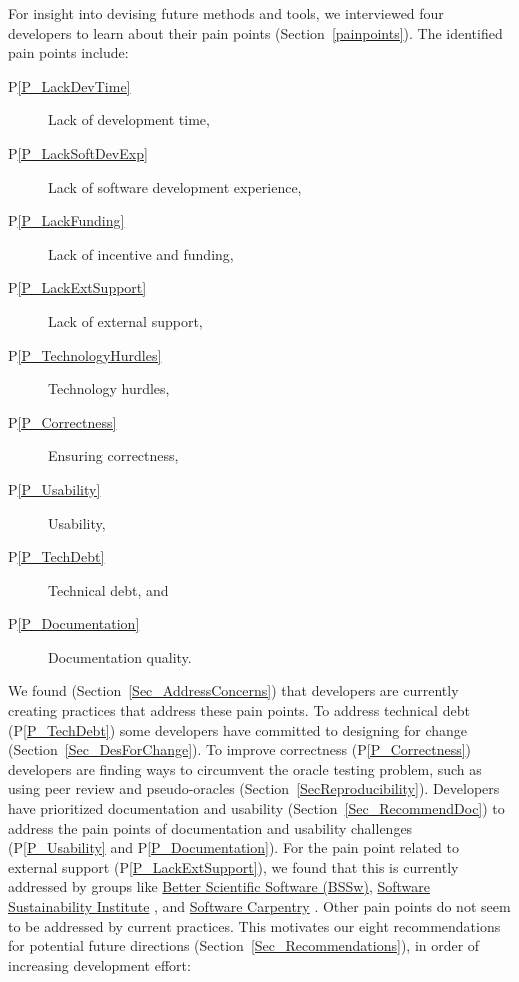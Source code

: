 \documentclass[final, 3p, times, authoryear]{elsarticle}
\newcommand{\ppref}[1]{P\ref{#1}}
\begin{document}
For insight into devising future methods and tools, we interviewed four
developers to learn about their pain points (Section~\ref{painpoints}).  The
identified pain points include: 

\begin{description}
\item [\ppref{P_LackDevTime}] Lack of development time, %
\item [\ppref{P_LackSoftDevExp}] Lack of software development experience, %
\item [\ppref{P_LackFunding}] Lack of incentive and funding, %
\item [\ppref{P_LackExtSupport}] Lack of external support, %
\item [\ppref{P_TechnologyHurdles}] Technology hurdles, %
\item [\ppref{P_Correctness}] Ensuring correctness, %
\item [\ppref{P_Usability}] Usability, %
\item [\ppref{P_TechDebt}] Technical debt, and %
\item [\ppref{P_Documentation}] Documentation quality. %
\end{description}  

We found (Section~\ref{Sec_AddressConcerns}) that developers are currently
creating practices that address these pain points.  To address technical debt
(\ppref{P_TechDebt}) some developers have committed to designing for change
(Section~\ref{Sec_DesForChange}). To improve correctness (\ppref{P_Correctness})
developers are finding ways to circumvent the oracle testing problem, such as
using peer review and pseudo-oracles (Section~\ref{SecReproducibility}).
Developers have prioritized documentation and usability
(Section~\ref{Sec_RecommendDoc}) to address the pain points of documentation and
usability challenges (\ppref{P_Usability} and \ppref{P_Documentation}).  For the
pain point related to external support (\ppref{P_LackExtSupport}), we found that
this is currently addressed by groups like \href{https://bssw.io/} {Better
Scientific Software (BSSw)},
\href{https://www.software.ac.uk/} {Software Sustainability Institute}
\citep{CrouchEtAl2013}, and \href{https://software-carpentry.org/}{Software
Carpentry} \citep{WilsonAndLumsdaine2006, Wilson2016}. Other pain points do not
seem to be addressed by current practices.  This motivates our eight
recommendations for potential future directions
(Section~\ref{Sec_Recommendations}), in order of increasing development effort:
\end{document}

